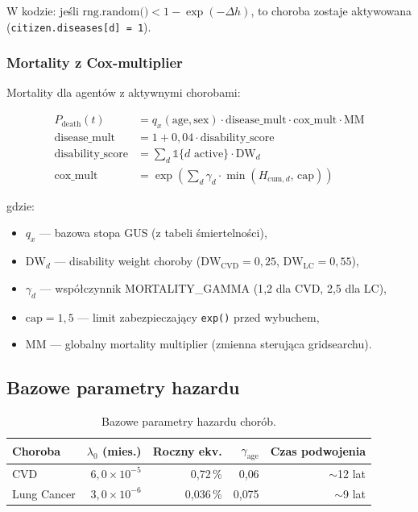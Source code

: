 \documentclass[11pt,a4paper]{article}
\newcommand{\cum}[1][]{H_{\mathrm{cum}#1}}
\newcommand{\baseh}{\lambda}                       %
\newcommand{\indicator}[1]{\mathbb{1}\{#1\}}
\begin{document}
W kodzie: jeśli $\text{rng.random()} < 1 - \exp(-\Delta h)$, to choroba zostaje aktywowana (\texttt{citizen.diseases[d] = 1}).

\subsubsection{Mortality z Cox-multiplier}

Mortality dla agentów z aktywnymi chorobami:

\begin{formulabox}
\begin{align*}
P_{\text{death}}(t) &= q_x(\text{age}, \text{sex}) \cdot \text{disease\_mult} \cdot \text{cox\_mult} \cdot \mathrm{MM} \\
\text{disease\_mult} &= 1 + 0{,}04 \cdot \text{disability\_score} \\
\text{disability\_score} &= \sum_d \indicator{d \text{ active}} \cdot \text{DW}_d \\
\text{cox\_mult} &= \exp\left(\sum_d \gamma_d \cdot \min(\cum[,d],\, \text{cap})\right)
\end{align*}
\end{formulabox}

gdzie:
\begin{itemize}[leftmargin=*]
  \item $q_x$ --- bazowa stopa GUS (z tabeli śmiertelności),
  \item $\text{DW}_d$ --- disability weight choroby ($\text{DW}_{\mathrm{CVD}} = 0{,}25$, $\text{DW}_{\mathrm{LC}} = 0{,}55$),
  \item $\gamma_d$ --- współczynnik MORTALITY\_GAMMA (1{,}2 dla CVD, 2{,}5 dla LC),
  \item $\text{cap} = 1{,}5$ --- limit zabezpieczający \texttt{exp()} przed wybuchem,
  \item $\mathrm{MM}$ --- globalny mortality multiplier (zmienna sterująca gridsearchu).
\end{itemize}

\subsection{Bazowe parametry hazardu}

\begin{table}[h]
\centering
\small
\begin{tabular}{lrrrr}
\toprule
\textbf{Choroba} & \textbf{$\baseh_0$} (mies.) & \textbf{Roczny ekv.} & \textbf{$\gamma_{\text{age}}$} & \textbf{Czas podwojenia} \\
\midrule
CVD          & $6{,}0 \times 10^{-5}$ & 0{,}72\,\% & 0{,}06   & $\sim$12 lat \\
Lung Cancer  & $3{,}0 \times 10^{-6}$ & 0{,}036\,\% & 0{,}075 & $\sim$9 lat \\
\bottomrule
\end{tabular}
\caption{Bazowe parametry hazardu chorób.}
\end{table}
\end{document}
